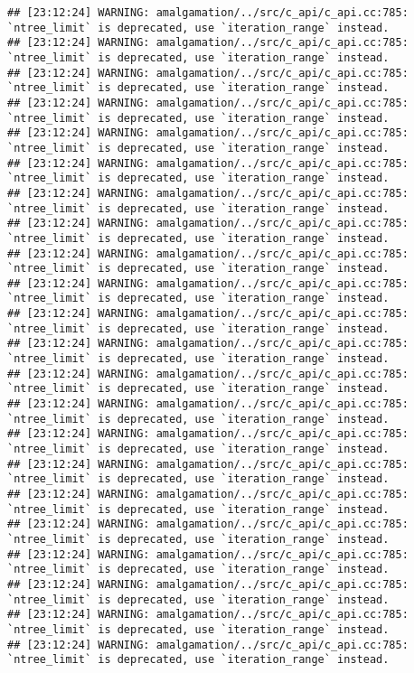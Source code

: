 \documentclass[
]{article}
\begin{document}
\begin{verbatim}
## [23:12:24] WARNING: amalgamation/../src/c_api/c_api.cc:785: `ntree_limit` is deprecated, use `iteration_range` instead.
## [23:12:24] WARNING: amalgamation/../src/c_api/c_api.cc:785: `ntree_limit` is deprecated, use `iteration_range` instead.
## [23:12:24] WARNING: amalgamation/../src/c_api/c_api.cc:785: `ntree_limit` is deprecated, use `iteration_range` instead.
## [23:12:24] WARNING: amalgamation/../src/c_api/c_api.cc:785: `ntree_limit` is deprecated, use `iteration_range` instead.
## [23:12:24] WARNING: amalgamation/../src/c_api/c_api.cc:785: `ntree_limit` is deprecated, use `iteration_range` instead.
## [23:12:24] WARNING: amalgamation/../src/c_api/c_api.cc:785: `ntree_limit` is deprecated, use `iteration_range` instead.
## [23:12:24] WARNING: amalgamation/../src/c_api/c_api.cc:785: `ntree_limit` is deprecated, use `iteration_range` instead.
## [23:12:24] WARNING: amalgamation/../src/c_api/c_api.cc:785: `ntree_limit` is deprecated, use `iteration_range` instead.
## [23:12:24] WARNING: amalgamation/../src/c_api/c_api.cc:785: `ntree_limit` is deprecated, use `iteration_range` instead.
## [23:12:24] WARNING: amalgamation/../src/c_api/c_api.cc:785: `ntree_limit` is deprecated, use `iteration_range` instead.
## [23:12:24] WARNING: amalgamation/../src/c_api/c_api.cc:785: `ntree_limit` is deprecated, use `iteration_range` instead.
## [23:12:24] WARNING: amalgamation/../src/c_api/c_api.cc:785: `ntree_limit` is deprecated, use `iteration_range` instead.
## [23:12:24] WARNING: amalgamation/../src/c_api/c_api.cc:785: `ntree_limit` is deprecated, use `iteration_range` instead.
## [23:12:24] WARNING: amalgamation/../src/c_api/c_api.cc:785: `ntree_limit` is deprecated, use `iteration_range` instead.
## [23:12:24] WARNING: amalgamation/../src/c_api/c_api.cc:785: `ntree_limit` is deprecated, use `iteration_range` instead.
## [23:12:24] WARNING: amalgamation/../src/c_api/c_api.cc:785: `ntree_limit` is deprecated, use `iteration_range` instead.
## [23:12:24] WARNING: amalgamation/../src/c_api/c_api.cc:785: `ntree_limit` is deprecated, use `iteration_range` instead.
## [23:12:24] WARNING: amalgamation/../src/c_api/c_api.cc:785: `ntree_limit` is deprecated, use `iteration_range` instead.
## [23:12:24] WARNING: amalgamation/../src/c_api/c_api.cc:785: `ntree_limit` is deprecated, use `iteration_range` instead.
## [23:12:24] WARNING: amalgamation/../src/c_api/c_api.cc:785: `ntree_limit` is deprecated, use `iteration_range` instead.
## [23:12:24] WARNING: amalgamation/../src/c_api/c_api.cc:785: `ntree_limit` is deprecated, use `iteration_range` instead.
## [23:12:24] WARNING: amalgamation/../src/c_api/c_api.cc:785: `ntree_limit` is deprecated, use `iteration_range` instead.

\end{verbatim}
\end{document}
